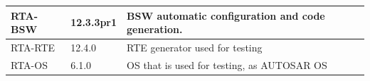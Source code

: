 \begin{longtable}{|l|l|l|}
\begin{minipage}{0.18\linewidth}\raggedright\vspace{.75ex}RTA-BSW\vspace{.75ex}\end{minipage} & \begin{minipage}{0.18\linewidth}\raggedright\vspace{.75ex}12.3.3pr1\vspace{.75ex}\end{minipage} & \begin{minipage}{0.55\linewidth}\raggedright\vspace{.75ex}BSW automatic configuration and code generation.\vspace{.75ex}\end{minipage}\\\hline
\begin{minipage}{0.18\linewidth}\raggedright\vspace{.75ex}RTA-RTE\vspace{.75ex}\end{minipage} & \begin{minipage}{0.18\linewidth}\raggedright\vspace{.75ex}12.4.0\vspace{.75ex}\end{minipage} & \begin{minipage}{0.55\linewidth}\raggedright\vspace{.75ex}RTE generator used for testing\vspace{.75ex}\end{minipage}\\\hline
\begin{minipage}{0.18\linewidth}\raggedright\vspace{.75ex}RTA-OS\vspace{.75ex}\end{minipage} & \begin{minipage}{0.18\linewidth}\raggedright\vspace{.75ex}6.1.0\vspace{.75ex}\end{minipage} & \begin{minipage}{0.55\linewidth}\raggedright\vspace{.75ex}OS that is used for testing, as AUTOSAR OS\vspace{.75ex}\end{minipage}\\\hline

\end{longtable}
